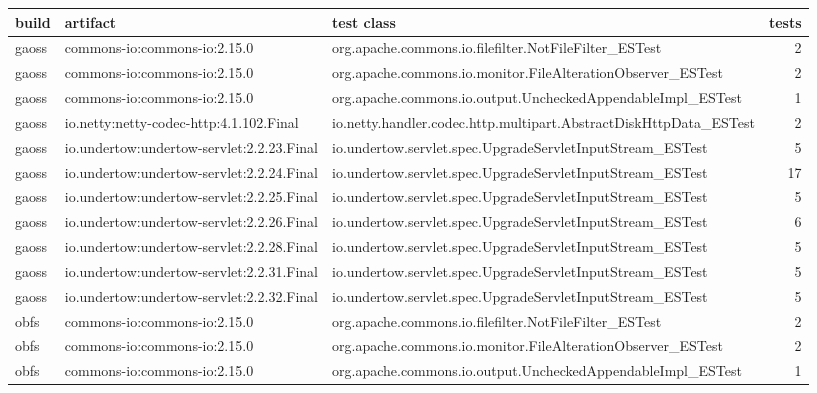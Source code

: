 \begin{tabular}{|p{0.5cm}p{5cm}p{7.5cm}r|} \hline build & artifact & test class & tests \\ \hline 
gaoss & commons-io:commons-io:2.15.0 & org.apache.commons.io.filefilter.NotFileFilter\_ESTest & 2 \\
gaoss & commons-io:commons-io:2.15.0 & org.apache.commons.io.monitor.FileAlterationObserver\_ESTest & 2 \\
gaoss & commons-io:commons-io:2.15.0 & org.apache.commons.io.output.UncheckedAppendableImpl\_ESTest & 1 \\
gaoss & io.netty:netty-codec-http:4.1.102.Final & io.netty.handler.codec.http.multipart.AbstractDiskHttpData\_ESTest & 2 \\
gaoss & io.undertow:undertow-servlet:2.2.23.Final & io.undertow.servlet.spec.UpgradeServletInputStream\_ESTest & 5 \\
gaoss & io.undertow:undertow-servlet:2.2.24.Final & io.undertow.servlet.spec.UpgradeServletInputStream\_ESTest & 17 \\
gaoss & io.undertow:undertow-servlet:2.2.25.Final & io.undertow.servlet.spec.UpgradeServletInputStream\_ESTest & 5 \\
gaoss & io.undertow:undertow-servlet:2.2.26.Final & io.undertow.servlet.spec.UpgradeServletInputStream\_ESTest & 6 \\
gaoss & io.undertow:undertow-servlet:2.2.28.Final & io.undertow.servlet.spec.UpgradeServletInputStream\_ESTest & 5 \\
gaoss & io.undertow:undertow-servlet:2.2.31.Final & io.undertow.servlet.spec.UpgradeServletInputStream\_ESTest & 5 \\
gaoss & io.undertow:undertow-servlet:2.2.32.Final & io.undertow.servlet.spec.UpgradeServletInputStream\_ESTest & 5 \\
obfs & commons-io:commons-io:2.15.0 & org.apache.commons.io.filefilter.NotFileFilter\_ESTest & 2 \\
obfs & commons-io:commons-io:2.15.0 & org.apache.commons.io.monitor.FileAlterationObserver\_ESTest & 2 \\
obfs & commons-io:commons-io:2.15.0 & org.apache.commons.io.output.UncheckedAppendableImpl\_ESTest & 1 \\
 \hline \end{tabular}
